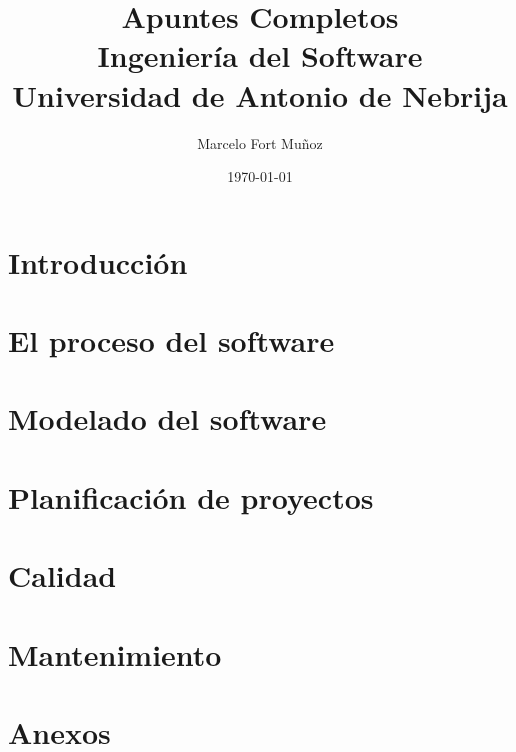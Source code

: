 \documentclass[a4paper,11pt]{report}
\title{Apuntes Completos \\[1ex] \large Ingeniería del Software \\ Universidad de Antonio de Nebrija}
\author{Marcelo Fort Muñoz}
\date{\today}
\begin{document}

    \maketitle
    \tableofcontents
    \newpage




    \chapter{Introducción}\label{ch:introduccion}
    


    \chapter{El proceso del software}\label{ch:el-proceso-del-software}
    


    \chapter{Modelado del software}\label{ch:modelado-del-software}
    


    \chapter{Planificación de proyectos}\label{ch:planificacion-de-proyectos}
    


    \chapter{Calidad}\label{ch:calidad}
    


    \chapter{Mantenimiento}\label{ch:mantenimiento}
    

    \chapter*{Anexos}
    
\end{document}
